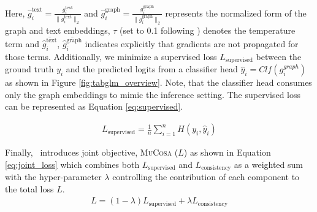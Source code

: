 Here, $\hat{g}_i^{\text{text}} = \frac{g_i^{\text{text}}}{\|g_i^{\text{text}}\|_2}$ and $\hat{g}_i^{\text{graph}} = \frac{g_i^{\text{graph}}}{\|g_i^{\text{graph}}\|_2}$ represents the normalized form of the graph and text embeddings, $\tau$ (set to 0.1 following \citet{chen2020simple}) denotes the temperature term and $\overline{\hat{g}_i^{\text{text}}}$, $\overline{\hat{g}_i^{\text{graph}}}$ indicates explicitly that gradients are not propagated for those terms.
Additionally, we minimize a supervised loss $L_{\text{supervised}}$ between the ground truth $y_i$ and the predicted logits from a classifier head $\hat{y}_i = Clf(g_i^{graph})$ as shown in Figure \ref{fig:tabglm_overview}. Note, that the classifier head consumes only the graph embeddings to mimic the inference setting.
The supervised loss can be represented as Equation \ref{eq:supervised}.

\begin{align}
    L_{\text{supervised}} = \frac{1}{n} \sum_{i = 1}^{n} H(y_i, \hat{y}_i)
\label{eq:supervised}
\end{align}

Finally, \tabglm\ introduces joint objective, \textsc{MuCosa} ($L$) as shown in Equation \ref{eq:joint_loss} which combines both $L_{\text{supervised}}$ and $L_{\text{consistency}}$ as a weighted sum with the hyper-parameter $\lambda$ controlling the contribution of each component to the total loss $L$.
\begin{align}
L = (1 - \lambda) L_{\text{supervised}} + \lambda L_{\text{consistency}}
\label{eq:joint_loss}
\end{align}
